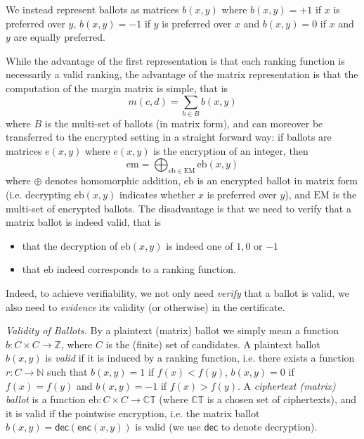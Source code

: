 \documentclass{llncs}
\newcommand{\Nat}{\mathbb{N}}
\newcommand{\Z}{\mathbb{Z}}
\newcommand{\encb}{\mathrm{eb}}
\newcommand{\EncB}{\mathrm{EM}}
\newcommand{\encm}{\mathrm{em}}
\newcommand{\CT}{\mathbb{CT}}
\newcommand{\dec}{\mathsf{dec}}
\newcommand{\enc}{\mathsf{enc}}
\begin{document}
We instead represent ballots as matrices
$b(x, y)$ where $b(x, y) = +1$ if $x$ is preferred
over $y$, $b(x, y) = -1$ if $y$ is preferred over $x$ and $b(x, y) =
0$ if $x$ and $y$ are equally preferred.

While the advantage of the first representation is that each ranking
function is necessarily a valid ranking, the advantage of the matrix 
representation is that the computation of
the margin matrix is simple, that is
\[ m(c, d) = \sum_{b \in B} b(x, y) \]
where $B$ is the multi-set of ballots (in matrix form), and can
moreover be transferred to the encrypted setting in a straight
forward way: if ballots are matrices $e(x,y)$ where $e(x,y)$ is the
encryption of an integer, then
\[ \encm = \bigoplus_{\encb \in \EncB} \encb(x, y) \]
where $\oplus$ denotes homomorphic addition, $\encb$ is an encrypted
ballot in matrix form (i.e. decrypting $\encb(x, y)$ indicates
whether $x$ is preferred over $y$), and $\EncB$ is the multi-set of
encrypted ballots. The disadvantage is that we need to verify that a
matrix ballot is indeed valid, that is
\begin{itemize}
\item that the decryption of $\encb(x, y)$ is indeed one of $1, 0$ or
$-1$
\item that $\encb$ indeed corresponds to a ranking function.
\end{itemize}

Indeed, to achieve verifiability, we not only need \emph{verify}
that a ballot is valid, we also need to \emph{evidence} its validity
(or otherwise) in the certificate.  

\smallskip\noindent\emph{Validity of Ballots.} By a plaintext
(matrix) ballot
we simply mean a function $b: C \times C \to \Z$,
where $C$ is the (finite) set of candidates. A 
plaintext ballot $b(x, y)$ 
is \emph{valid} if it is induced by a ranking function, i.e.
there exists a function $r: C \to \Nat$ such that $b(x, y) = 1$ if
$f(x) < f(y)$, $b(x, y) = 0$ if $f(x) = f(y)$ and $b(x, y) = -1$ if
$f(x) > f(y)$. A \emph{ciphertext (matrix) ballot} is a function
$\encb: C \times C \to \CT$ (where $\CT$ is a chosen set of
ciphertexts), and it is valid if the pointwise encryption, i.e. the
matrix ballot $b(x, y) = \dec(\enc(x,y))$ is valid (we use $\dec$ to
denote decryption). 
\end{document}
